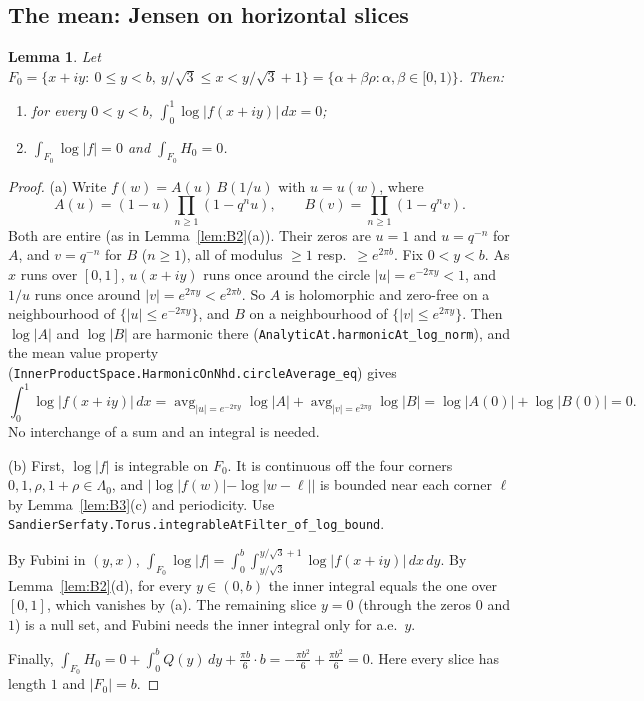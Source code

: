 \documentclass[11pt]{article}
\newtheorem{lemma}[theorem]{Lemma}
\theoremstyle{definition}
\theoremstyle{remark}
\newcommand{\LamO}{\Lambda_0}
\newcommand{\lean}[1]{\texttt{#1}}
\begin{document}
\subsection{The mean: Jensen on horizontal slices}

\begin{lemma}\label{lem:B4}
Let $F_0=\{x+iy:\ 0\le y<b,\ y/\sqrt3\le x<y/\sqrt3+1\}=\{\alpha+\beta\rho:\alpha,\beta\in[0,1)\}$. Then:
\begin{enumerate}
\item[(a)] for every $0<y<b$, $\int_0^1\log|f(x+iy)|\,dx=0$;
\item[(b)] $\int_{F_0}\log|f|=0$ and $\int_{F_0}H_0=0$.
\end{enumerate}
\end{lemma}

\begin{proof}
(a) Write $f(w)=A(u)\,B(1/u)$ with $u=u(w)$, where
\[
 A(u)=(1-u)\prod_{n\ge1}(1-q^nu),\qquad B(v)=\prod_{n\ge1}(1-q^nv) .
\]
Both are entire (as in Lemma~\ref{lem:B2}(a)). Their zeros are $u=1$ and $u=q^{-n}$ for $A$, and $v=q^{-n}$
for $B$ ($n\ge1$), all of modulus $\ge1$ resp.\ $\ge e^{2\pi b}$. Fix $0<y<b$. As $x$ runs over $[0,1]$,
$u(x+iy)$ runs once around the circle $|u|=e^{-2\pi y}<1$, and $1/u$ runs once around $|v|=e^{2\pi y}<e^{2\pi b}$.
So $A$ is holomorphic and zero-free on a neighbourhood of $\{|u|\le e^{-2\pi y}\}$, and $B$ on a neighbourhood
of $\{|v|\le e^{2\pi y}\}$. Then $\log|A|$ and $\log|B|$ are harmonic there
(\lean{AnalyticAt.harmonicAt\_log\_norm}), and the mean value property
(\lean{InnerProductSpace.HarmonicOnNhd.circleAverage\_eq})
gives
\[
 \int_0^1\log|f(x+iy)|\,dx=\operatorname{avg}_{|u|=e^{-2\pi y}}\log|A|+\operatorname{avg}_{|v|=e^{2\pi y}}\log|B|
 =\log|A(0)|+\log|B(0)|=0 .
\]
No interchange of a sum and an integral is needed.

(b) First, $\log|f|$ is integrable on $F_0$. It is continuous off the four corners
$0,1,\rho,1+\rho\in\LamO$, and $|\log|f(w)|-\log|w-\ell||$ is bounded near each corner $\ell$ by
Lemma~\ref{lem:B3}(c) and periodicity. Use \lean{SandierSerfaty.Torus.integrableAtFilter\_of\_log\_bound}.

By Fubini in $(y,x)$, $\int_{F_0}\log|f|=\int_0^b\int_{y/\sqrt3}^{y/\sqrt3+1}\log|f(x+iy)|\,dx\,dy$. By
Lemma~\ref{lem:B2}(d), for every $y\in(0,b)$ the inner integral equals the one over $[0,1]$, which vanishes by
(a). The remaining slice $y=0$ (through the zeros $0$ and $1$) is a null set, and Fubini needs the inner
integral only for a.e.\ $y$.

Finally, $\int_{F_0}H_0=0+\int_0^bQ(y)\,dy+\frac{\pi b}6\cdot b=-\frac{\pi b^2}6+\frac{\pi b^2}6=0$. Here every slice
has length $1$ and $|F_0|=b$.
\end{proof}
\end{document}

